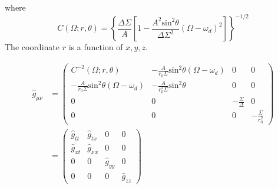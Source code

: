 \documentclass[english]{article}
\begin{document}
 where 
\[
C\left(\Omega;r,\theta\right)=\left\{ \frac{\Delta\Sigma}{A}\left[1-\frac{A^{2}\text{sin}^{2}\theta}{\Delta\Sigma^{2}}\left(\Omega-\omega_{d}\right)^{2}\right]\right\} ^{-1/2}
\]
 The coordinate $r$ is a function of $x,y,z$.

\begin{align*}
\hat{g}_{\mu\nu} & =\begin{pmatrix}C^{-2}\left(\Omega;r,\theta\right) & -\frac{A}{r_{0}\Sigma}\text{sin}^{2}\theta\left(\Omega-\omega_{d}\right) & 0 & 0\\
-\frac{A}{r_{0}\Sigma}\text{sin}^{2}\theta\left(\Omega-\omega_{d}\right) & -\frac{A}{r^{2}_{0}\Sigma}\text{sin}^{2}\theta & 0 & 0\\
0 & 0 & -\frac{\Sigma}{\Delta} & 0\\
0 & 0 & 0 & -\frac{\Sigma}{r^{2}_{0}}
\end{pmatrix}\\
 & =\begin{pmatrix}\hat{g}_{tt} & \hat{g}_{tx} & 0 & 0\\
\hat{g}_{xt} & \hat{g}_{xx} & 0 & 0\\
0 & 0 & \hat{g}_{yy} & 0\\
0 & 0 & 0 & \hat{g}_{zz}
\end{pmatrix}
\end{align*}
\end{document}
